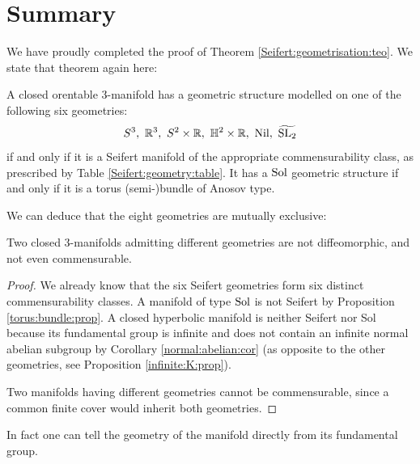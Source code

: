 \section{Summary}
We have proudly completed the proof of Theorem \ref{Seifert:geometrisation:teo}. We state that theorem again here:

\begin{teo} 
A closed orentable 3-manifold has a geometric structure modelled on one of the following six geometries:
$$S^3,\ \matR^3,\ S^2\times \matR,\ \matH^2\times \matR,\ \Nil,\ \widetilde{\SL_2}$$
if and only if it is a Seifert manifold of the appropriate commensurability class, as prescribed by Table \ref{Seifert:geometry:table}. It has a ${\rm Sol}$ geometric structure if and only if it is a torus (semi-)bundle of Anosov type.
\end{teo}

We can deduce that the eight geometries are mutually exclusive:

\begin{prop}
Two closed 3-manifolds admitting different geometries are not diffeomorphic, and not even commensurable.
\end{prop}
\begin{proof}
We already know that the six Seifert geometries form six distinct commensurability classes. A manifold of type ${\rm Sol}$ is not Seifert by Proposition \ref{torus:bundle:prop}. A closed hyperbolic manifold is neither Seifert nor Sol because its fundamental group is infinite and does not contain an infinite normal abelian subgroup by Corollary \ref{normal:abelian:cor} (as opposite to the other geometries, see Proposition \ref{infinite:K:prop}).

Two manifolds having different geometries cannot be commensurable, since a common finite cover would inherit both geometries. 
\end{proof}

In fact one can tell the geometry of the manifold directly from its fundamental group. 

